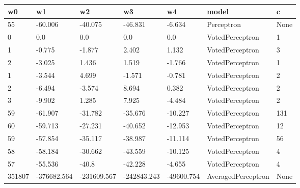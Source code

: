 \begin{tabular}{lllllll}
\toprule
w0 & w1 & w2 & w3 & w4 & model & c \\
\midrule
55 & -60.006 & -40.075 & -46.831 & -6.634 & Perceptron & None \\
0 & 0.0 & 0.0 & 0.0 & 0.0 & VotedPerceptron & 1 \\
1 & -0.775 & -1.877 & 2.402 & 1.132 & VotedPerceptron & 3 \\
2 & -3.025 & 1.436 & 1.519 & -1.766 & VotedPerceptron & 1 \\
1 & -3.544 & 4.699 & -1.571 & -0.781 & VotedPerceptron & 2 \\
2 & -6.494 & -3.574 & 8.694 & 0.382 & VotedPerceptron & 2 \\
3 & -9.902 & 1.285 & 7.925 & -4.484 & VotedPerceptron & 2 \\
59 & -61.907 & -31.782 & -35.676 & -10.227 & VotedPerceptron & 131 \\
60 & -59.713 & -27.231 & -40.652 & -12.953 & VotedPerceptron & 12 \\
59 & -57.854 & -35.117 & -38.987 & -11.114 & VotedPerceptron & 56 \\
58 & -58.184 & -30.662 & -43.559 & -10.125 & VotedPerceptron & 4 \\
57 & -55.536 & -40.8 & -42.228 & -4.655 & VotedPerceptron & 4 \\
351807 & -376682.564 & -231609.567 & -242843.243 & -49600.754 & AveragedPerceptron & None \\
\bottomrule
\end{tabular}
